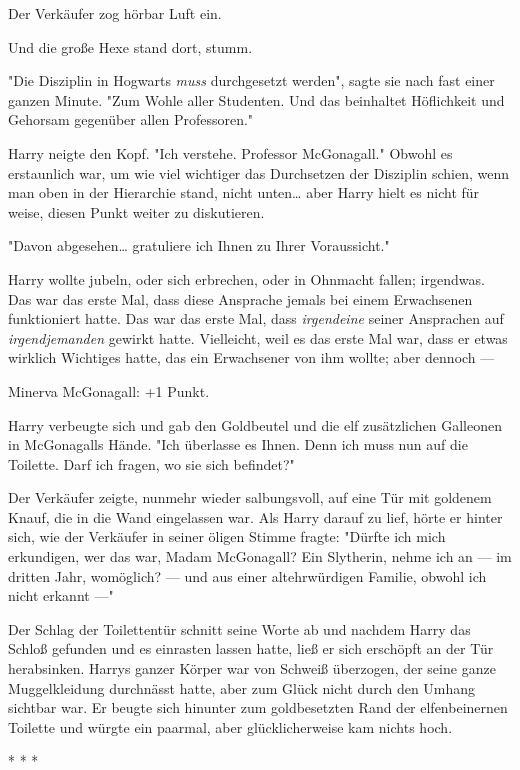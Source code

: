 {Der Verkäufer zog hörbar Luft ein.

Und die große Hexe stand dort, stumm.

"Die Disziplin in Hogwarts \emph{muss} durchgesetzt werden", sagte sie nach fast einer ganzen Minute. "Zum Wohle aller Studenten. Und das beinhaltet Höflichkeit und Gehorsam gegenüber allen Professoren."

Harry neigte den Kopf. "Ich verstehe. Professor McGonagall." Obwohl es erstaunlich war, um wie viel wichtiger das Durchsetzen der Disziplin schien, wenn man oben in der Hierarchie stand, nicht unten… aber Harry hielt es nicht für weise, diesen Punkt weiter zu diskutieren.

"Davon abgesehen… gratuliere ich Ihnen zu Ihrer Voraussicht."

Harry wollte jubeln, oder sich erbrechen, oder in Ohnmacht fallen; irgendwas. Das war das erste Mal, dass diese Ansprache jemals bei einem Erwachsenen funktioniert hatte. Das war das erste Mal, dass \emph{irgendeine} seiner Ansprachen auf \emph{irgendjemanden} gewirkt hatte. Vielleicht, weil es das erste Mal war, dass er etwas wirklich Wichtiges hatte, das ein Erwachsener von ihm wollte; aber dennoch ---

Minerva McGonagall: +1 Punkt.

Harry verbeugte sich und gab den Goldbeutel und die elf zusätzlichen Galleonen in McGonagalls Hände. "Ich überlasse es Ihnen. Denn ich muss nun auf die Toilette. Darf ich fragen, wo sie sich befindet?"

Der Verkäufer zeigte, nunmehr wieder salbungsvoll, auf eine Tür mit goldenem Knauf, die in die Wand eingelassen war. Als Harry darauf zu lief, hörte er hinter sich, wie der Verkäufer in seiner öligen Stimme fragte: "Dürfte ich mich erkundigen, wer das war, Madam McGonagall? Ein Slytherin, nehme ich an --- im dritten Jahr, womöglich? --- und aus einer altehrwürdigen Familie, obwohl ich nicht erkannt ---"

Der Schlag der Toilettentür schnitt seine Worte ab und nachdem Harry das Schloß gefunden und es einrasten lassen hatte, ließ er sich erschöpft an der Tür herabsinken. Harrys ganzer Körper war von Schweiß überzogen, der seine ganze Muggelkleidung durchnässt hatte, aber zum Glück nicht durch den Umhang sichtbar war. Er beugte sich hinunter zum goldbesetzten Rand der elfenbeinernen Toilette und würgte ein paarmal, aber glücklicherweise kam nichts hoch.

* * *

}
